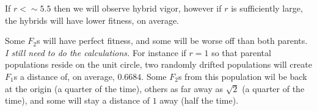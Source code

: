 \documentclass{article}
\newcommand{\jss}[1]{{\color{olive}\it #1}}
\newcommand{\1}{\mathbbm{1}}
\begin{document}
If $r < \sim 5.5$ then we will observe hybrid vigor, however if $r$ is sufficiently large, the hybrids will have lower fitness, on average. 

Some $F_2$s will have perfect fitness, and some will be worse off than both parents. \jss{I still need to do the calculations.} For instance if $r=1$ so that parental populations reside on the unit circle, two randomly drifted populations will create $F_1$s a distance of, on average, $0.6684$. Some $F_2$s from this population wil be back at the origin (a quarter of the time), others as far away as $\sqrt{2}$ (a quarter of the time), and some will stay a distance of $1$ away (half the time).
\end{document}
